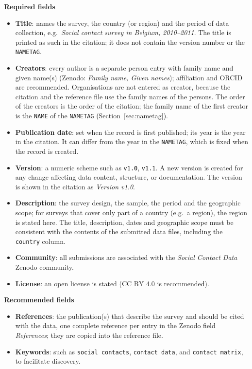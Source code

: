 \documentclass[11pt,a4paper]{article}
\begin{document}
\medskip
\noindent \textbf{Required fields}
\begin{itemize}
    \item \textbf{Title}: names the survey, the country (or region) and the period of data collection, e.g.\ \textit{Social contact survey in Belgium, 2010--2011}. The title is printed as such in the citation; it does not contain the version number or the \texttt{NAMETAG}.
    \item \textbf{Creators}: every author is a separate person entry with family name and given name(s) (Zenodo: \textit{Family name, Given names}); affiliation and ORCID are recommended. Organisations are not entered as creator, because the citation and the reference file use the family names of the persons. The order of the creators is the order of the citation; the family name of the first creator is the \texttt{NAME} of the \texttt{NAMETAG} (Section~\ref{sec:nametag}).
    \item \textbf{Publication date}: set when the record is first published; its year is the year in the citation. It can differ from the year in the \texttt{NAMETAG}, which is fixed when the record is created.
    \item \textbf{Version}: a numeric scheme such as \texttt{v1.0}, \texttt{v1.1}. A new version is created for any change affecting data content, structure, or documentation. The version is shown in the citation as \textit{Version v1.0}.
    \item \textbf{Description}: the survey design, the sample, the period and the geographic scope; for surveys that cover only part of a country (e.g.\ a region), the region is stated here. The title, description, dates and geographic scope must be consistent with the contents of the submitted data files, including the \texttt{country} column.
    \item \textbf{Community}: all submissions are associated with the \textit{Social Contact Data} Zenodo community.
    \item \textbf{License}: an open license is stated (CC BY 4.0 is recommended).
\end{itemize}

\medskip
\noindent \textbf{Recommended fields}
\begin{itemize}
    \item \textbf{References}: the publication(s) that describe the survey and should be cited with the data, one complete reference per entry in the Zenodo field \textit{References}; they are copied into the reference file.
    \item \textbf{Keywords}: such as \texttt{social contacts}, \texttt{contact data}, and \texttt{contact matrix}, to facilitate discovery.
\end{itemize}
\end{document}

